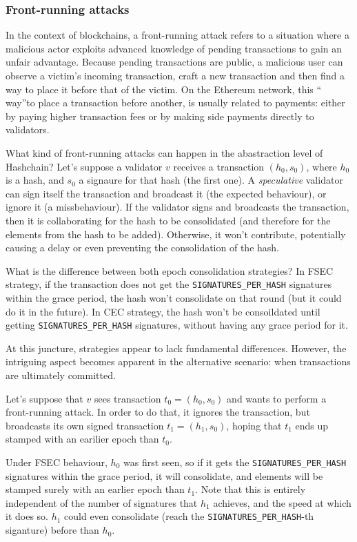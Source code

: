 \subsubsection{Front-running attacks}
In the context of blockchains, a front-running attack refers to a situation where
a malicious actor exploits advanced knowledge of pending transactions to gain an
unfair advantage. Because pending transactions are public, a malicious user can
observe a victim's incoming transaction, craft a new transaction and then find a way
to place it before that of the victim. On the Ethereum network, this \textquotedblleft
way\textquotedblright to place a transaction before another, is usually related
to payments: either by paying higher transaction fees or by making side payments
directly to validators.

What kind of front-running attacks can happen in the abastraction level of Hashchain?
Let's suppose a validator $v$ receives a transaction $(h_0, s_0)$, where $h_0$ is a hash,
and $s_0$ a signaure for that hash (the first one). A \textit{speculative} validator can
sign itself the
transaction and broadcast it (the expected behaviour), or
ignore it (a missbehaviour). If the validator signs and broadcasts the transaction,
then it is collaborating for the hash to be consolidated (and therefore for the elements
from the hash to be added).
Otherwise, it won't contribute, potentially causing a delay or even preventing the
consolidation of the hash.

What is the difference between both epoch consolidation strategies?
In FSEC strategy, if the transaction does not get the \texttt{SIGNATURES\_PER\_HASH}
signatures within the grace period, the hash won't consolidate on that round (but it could
do it in the future).
In CEC strategy, the hash won't be consoildated until getting
\texttt{SIGNATURES\_PER\_HASH} signatures, without having any grace period for it.

At this juncture, strategies appear to lack fundamental differences. However, the
intriguing aspect becomes apparent in the alternative scenario: when transactions are
ultimately committed.

Let's suppose that $v$ sees transaction $t_0 = (h_0, s_0)$ and wants to perform a front-running
attack. In order to do that, it ignores the transaction, but broadcasts its own signed
transaction $t_1 = (h_1, s_0)$, hoping that $t_1$ ends up stamped with an earilier epoch than $t_0$.

Under FSEC behaviour, $h_0$ was first seen, so if it gets the \texttt{SIGNATURES\_PER\_HASH}
signatures within the grace period, it will consolidate, and elements will be stamped surely with an earlier
epoch than $t_1$.
Note that this is entirely independent of the number of signatures that $h_1$ achieves, and the
speed at which it does so. $h_1$ could even consolidate (reach the \texttt{SIGNATURES\_PER\_HASH}-th
siganture) before than $h_0$.

